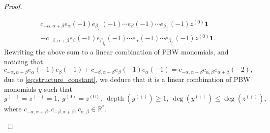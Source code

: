 \documentclass[JEP,XML,SOM,Unicode]{cedram}
\let\al\alpha
\let\be\beta
\DeclareMathOperator{\dep}{depth}
\theoremstyle{definition}
\begin{document}
\begin{proof}
\begin{itemize}
\begin{multline*}
c_{-\al,\al+\be}e_{\al}(-1)e_{\be_{j_1}}(-1) \cdots e_{\be}(-1)\cdots e_{\be_{j_t}}(-1) z^{(0)} \mathbf{1}\\
+c_{-\be,\al+\be}e_{\be}(-1)e_{\be_{j_1}}(-1) \cdots e_{\al}(-1)\cdots e_{\be_{j_t}}(-1) z^{(0)} \mathbf{1}.
\end{multline*}
Rewriting the above sum to a linear combination of PBW monomials, and noticing that
\[
c_{-\al,\al+\be}e_{\al}(-1)e_{\be}(-1)+c_{-\be,\al+\be}e_{\be}(-1)e_{\al}(-1)=c_{-\al,\al+\be}c_{\al,\be}e_{\al+\be}(-2),
\]
due to \eqref{eq:structure_constant},
we deduce that it is a linear combination of PBW monomials $y$ such that
\begin{equation}\label{e43}y^{(-)}=z^{(-)}=1, \ y^{(0)}=z^{(0)}, \ \dep(y^{(+)})\geq 1, \ \deg(y^{(+)})\leq \deg(z^{(+)}),
\end{equation}
where $c_{-\al,\al+\be}, c_{-\be,\al+\be}, c_{\al,\be}\in {\mathbb R}^*$.


\end{itemize}
\end{proof}
\end{document}
